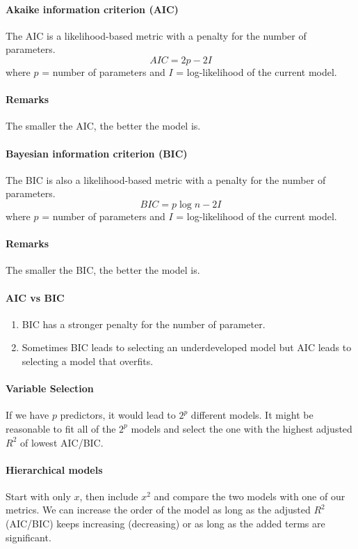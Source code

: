 \documentclass[11pt]{article}
\begin{document}
\paragraph{Akaike information criterion (AIC)}
The AIC is a likelihood-based metric with a penalty for the number of parameters.
$$AIC = 2p - 2I$$
where $p$ = number of parameters and $I$ = log-likelihood of the current model.
\paragraph{Remarks}
The smaller the AIC, the better the model is.
\paragraph{Bayesian information criterion (BIC)}
The BIC is also a likelihood-based metric with a penalty for the number of parameters.
$$BIC = p\log{n} - 2I$$
where $p$ = number of parameters and $I$ = log-likelihood of the current model.
\paragraph{Remarks}
The smaller the BIC, the better the model is.
\paragraph{AIC vs BIC}
\begin{enumerate}
	\item BIC has a stronger penalty for the number of parameter.
	\item Sometimes BIC leads to selecting an underdeveloped model but AIC leads to selecting a model that overfits.
\end{enumerate}
\paragraph{Variable Selection}
If we have $p$ predictors, it would lead to $2^p$ different models. It might be reasonable to fit all of the $2^p$ models and select the one with the highest adjusted $R^2$ of lowest AIC/BIC.
\paragraph{Hierarchical models}
Start with only $x$, then include $x^2$ and compare the two models with one of our metrics. We can increase the order of the model as long as the adjusted $R^2$ (AIC/BIC) keeps increasing (decreasing) or as long as the added terms are significant.
\end{document}
